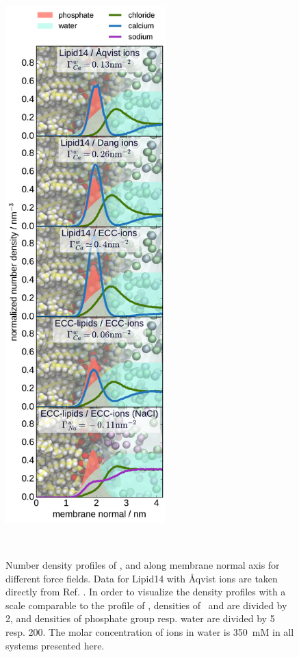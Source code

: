 \documentclass[aip,jcp,twocolumn]{revtex4}
\begin{document}
\begin{figure}[tbp]
  \centering
  \includegraphics[height=20.0cm]{../Fig/ipython_nb/density_profiles_ca_cl_wat_phos_models-compar.pdf}
  \caption{\label{fig:cacl-dens}
    Number density profiles of ,  and  along membrane normal axis
    for different force fields. Data for Lipid14 with \AA{}qvist ions are taken directly from Ref. .
    In order to visualize the density profiles with a scale comparable to the profile of , 
    densities of~ and  are divided by 2, and
    densities of phosphate group resp. water are divided by 5 resp. 200. 
    The molar concentration of ions in water is 350~mM in all systems
    presented here. 
    }
   \\
\end{figure}
\end{document}
